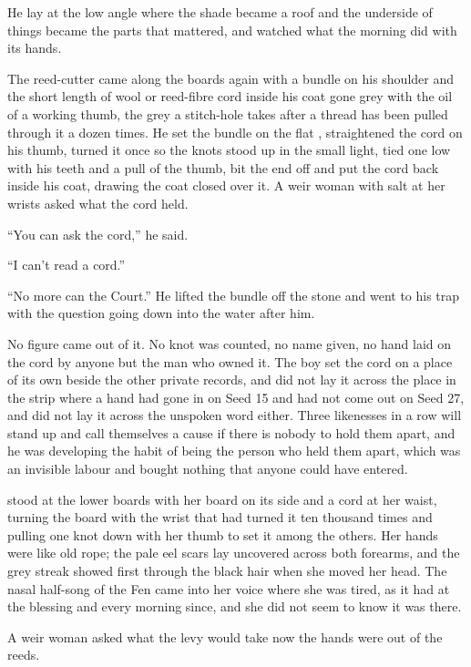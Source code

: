 He lay at the low angle where the shade became a roof and the underside of things became the parts that mattered, and watched what the morning did with its hands.

The reed-cutter came along the boards again with a bundle on his shoulder and the short length of wool or reed-fibre cord inside his coat gone grey with the oil of a working thumb, the grey a stitch-hole takes after a thread has been pulled through it a dozen times. He set the bundle on the flat , straightened the cord on his thumb, turned it once so the knots stood up in the small light, tied one low with his teeth and a pull of the thumb, bit the end off and put the cord back inside his coat, drawing the coat closed over it. A weir woman with salt at her wrists asked what the cord held.

“You can ask the cord,” he said.

“I can't read a cord.”

“No more can the Court.” He lifted the bundle off the stone and went to his trap with the question going down into the water after him.

No figure came out of it. No knot was counted, no name given, no hand laid on the cord by anyone but the man who owned it. The boy set the cord on a place of its own beside the other private records, and did not lay it across the place in the strip where a hand had gone in on Seed 15 and had not come out on Seed 27, and did not lay it across the unspoken word either. Three likenesses in a row will stand up and call themselves a cause if there is nobody to hold them apart, and he was developing the habit of being the person who held them apart, which was an invisible labour and bought nothing that anyone could have entered.

\scenebreak

 stood at the lower boards with her board on its side and a cord at her waist, turning the board with the wrist that had turned it ten thousand times and pulling one knot down with her thumb to set it among the others. Her hands were like old rope; the pale eel scars lay uncovered across both forearms, and the grey streak showed first through the black hair when she moved her head. The nasal half-song of the Fen came into her voice where she was tired, as it had at the blessing and every morning since, and she did not seem to know it was there.

A weir woman asked what the levy would take now the hands were out of the reeds.

